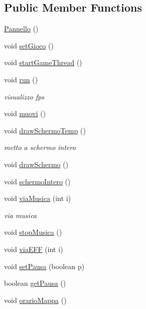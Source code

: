 \subsection*{Public Member Functions}
\begin{DoxyCompactItemize}
\item 
\hyperlink{classa_1_1survival_1_1game_1_1_pannello_ab70bbeb2810224fb9e495d09a0b78ede}{Pannello} ()
\item 
void \hyperlink{classa_1_1survival_1_1game_1_1_pannello_a656b18ea5779c5d29c83a5abea629534}{set\+Gioco} ()
\item 
void \hyperlink{classa_1_1survival_1_1game_1_1_pannello_aeadd7c80de430e172e3231afe0d94bd1}{start\+Game\+Thread} ()
\item 
void \hyperlink{classa_1_1survival_1_1game_1_1_pannello_a13a43e6d814de94978c515cb084873b1}{run} ()
\begin{DoxyCompactList}\small\item\em visualizzo fps \end{DoxyCompactList}\item 
void \hyperlink{classa_1_1survival_1_1game_1_1_pannello_a1fe2f184b3cc7345c6a0f08d183a1d0b}{muovi} ()
\item 
void \hyperlink{classa_1_1survival_1_1game_1_1_pannello_a65c6d6be4b2a0069d1920cb7f466643b}{draw\+Schermo\+Temp} ()
\begin{DoxyCompactList}\small\item\em metto a schermo intero \end{DoxyCompactList}\item 
void \hyperlink{classa_1_1survival_1_1game_1_1_pannello_ab07487900bba57d73694e694968a1993}{draw\+Schermo} ()
\item 
void \hyperlink{classa_1_1survival_1_1game_1_1_pannello_afcdfb03d382a1f735d929602329d276b}{schermo\+Intero} ()
\item 
void \hyperlink{classa_1_1survival_1_1game_1_1_pannello_a443c6be9d46440deb1e73b957e28d56e}{via\+Musica} (int i)
\begin{DoxyCompactList}\small\item\em via musica \end{DoxyCompactList}\item 
void \hyperlink{classa_1_1survival_1_1game_1_1_pannello_a2e8ba1ecd18a0f6434c051caa55bb9d3}{stop\+Musica} ()
\item 
void \hyperlink{classa_1_1survival_1_1game_1_1_pannello_ace78d33408180273c794117936ab01e0}{via\+E\+FF} (int i)
\item 
void \hyperlink{classa_1_1survival_1_1game_1_1_pannello_a2283a8c1211827155404ab0ccb5c65c4}{set\+Pausa} (boolean p)
\item 
boolean \hyperlink{classa_1_1survival_1_1game_1_1_pannello_a6e565369e7a4cd8bee8616ba06ebae08}{get\+Pausa} ()
\item 
void \hyperlink{classa_1_1survival_1_1game_1_1_pannello_abe2c4192cc87f74e6d45d5b5fe5283c3}{orario\+Mappa} ()
\end{DoxyCompactItemize}
